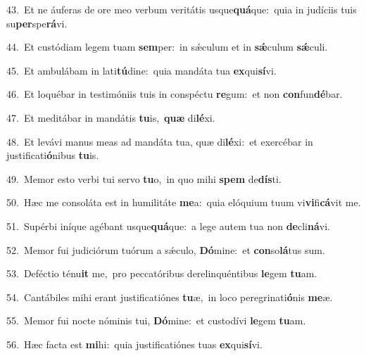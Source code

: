 {\numbfont\textcolor{\numbcolor}{43.}}~Et ne áuferas de ore meo verbum veritátis usque\-\textbf{quá}\-que:~\star quia in judíciis tuis su\-\textbf{per}\-spe\-\textbf{rá}\-vi.\par
{\numbfont\textcolor{\numbcolor}{44.}}~Et custódiam legem tuam \textbf{sem}\-per:~\star in sǽculum et in \textbf{sǽ}\-culum \textbf{sǽ}\-culi.\par
{\numbfont\textcolor{\numbcolor}{45.}}~Et ambulábam in lati\-\textbf{tú}\-dine:~\star quia mandáta tua \textbf{ex}\-qui\-\textbf{sí}\-vi.\par
{\numbfont\textcolor{\numbcolor}{46.}}~Et loquébar in testimóniis tuis in conspéctu \textbf{re}\-gum:~\star et non \textbf{con}\-fun\-\textbf{dé}\-bar.\par
{\numbfont\textcolor{\numbcolor}{47.}}~Et meditábar in mandátis \textbf{tu}\-is,~\star \textbf{quæ} di\-\textbf{lé}\-xi.\par
{\numbfont\textcolor{\numbcolor}{48.}}~Et levávi manus meas ad mandáta tua, quæ di\-\textbf{lé}\-xi:~\star et exercébar in justificati\-\textbf{ó}\-nibus \textbf{tu}\-is.\par
{\numbfont\textcolor{\numbcolor}{49.}}~Memor esto verbi tui servo \textbf{tu}\-o,~\star in quo mihi \textbf{spem} de\-\textbf{dís}\-ti.\par
{\numbfont\textcolor{\numbcolor}{50.}}~Hæc me consoláta est in humilitáte \textbf{me}\-a:~\star quia elóquium tuum vi\-\textbf{vi}\-fi\-\textbf{cá}\-vit me.\par
{\numbfont\textcolor{\numbcolor}{51.}}~Supérbi iníque agébant usque\-\textbf{quá}\-que:~\star a lege autem tua non \textbf{de}\-cli\-\textbf{ná}\-vi.\par
{\numbfont\textcolor{\numbcolor}{52.}}~Memor fui judiciórum tuórum a sǽculo, \textbf{Dó}\-mine:~\star et \textbf{con}\-so\-\textbf{lá}\-tus sum.\par
{\numbfont\textcolor{\numbcolor}{53.}}~Deféctio ténu\textbf{it} me,~\star pro peccatóribus derelinquéntibus \textbf{le}\-gem \textbf{tu}\-am.\par
{\numbfont\textcolor{\numbcolor}{54.}}~Cantábiles mihi erant justificatiónes \textbf{tu}\-æ,~\star in loco peregrinati\-\textbf{ó}\-nis \textbf{me}\-æ.\par
{\numbfont\textcolor{\numbcolor}{55.}}~Memor fui nocte nóminis tui, \textbf{Dó}\-mine:~\star et custodívi \textbf{le}\-gem \textbf{tu}\-am.\par
{\numbfont\textcolor{\numbcolor}{56.}}~Hæc facta est \textbf{mi}\-hi:~\star quia justificatiónes tuas \textbf{ex}\-qui\-\textbf{sí}\-vi.\par
